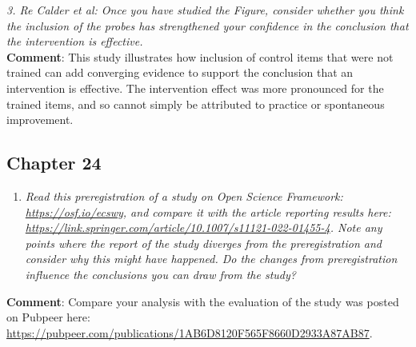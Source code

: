 \documentclass{krantz}
\providecommand{\tightlist}{%
\setlength{\itemsep}{0pt}\setlength{\parskip}{0pt}}
\begin{document}
\emph{3. Re Calder et al: Once you have studied the Figure, consider whether you think the inclusion of the probes has strengthened your confidence in the conclusion that the intervention is effective.}\\
\textbf{Comment}: This study illustrates how inclusion of control items that were not trained can add converging evidence to support the conclusion that an intervention is effective. The intervention effect was more pronounced for the trained items, and so cannot simply be attributed to practice or spontaneous improvement.

\hypertarget{chapter-24}{%
\subsection{Chapter 24}\label{chapter-24}}

\begin{enumerate}
\def\labelenumi{\arabic{enumi}.}
\tightlist
\item
  \emph{Read this preregistration of a study on Open Science Framework: \url{https://osf.io/ecswy}, and compare it with the article reporting results here: \url{https://link.springer.com/article/10.1007/s11121-022-01455-4}. Note any points where the report of the study diverges from the preregistration and consider why this might have happened. Do the changes from preregistration influence the conclusions you can draw from the study?}
\end{enumerate}

\textbf{Comment}: Compare your analysis with the evaluation of the study was posted on Pubpeer here: \url{https://pubpeer.com/publications/1AB6D8120F565F8660D2933A87AB87}.
\end{document}
